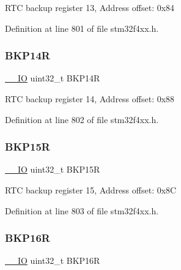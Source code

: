 R\+TC backup register 13, Address offset\+: 0x84 

Definition at line 801 of file stm32f4xx.\+h.

\mbox{\label{struct_r_t_c___type_def_ac60f13e6619724747e61cfbff55b9fab}} 
\subsubsection{\texorpdfstring{B\+K\+P14R}{BKP14R}}
{\footnotesize\ttfamily \hyperlink{group___c_m_s_i_s__core__definitions_gaec43007d9998a0a0e01faede4133d6be}{\+\_\+\+\_\+\+IO} uint32\+\_\+t B\+K\+P14R}

R\+TC backup register 14, Address offset\+: 0x88 

Definition at line 802 of file stm32f4xx.\+h.

\mbox{\label{struct_r_t_c___type_def_afafaddc3a983eb71332b7526d82191ad}} 
\subsubsection{\texorpdfstring{B\+K\+P15R}{BKP15R}}
{\footnotesize\ttfamily \hyperlink{group___c_m_s_i_s__core__definitions_gaec43007d9998a0a0e01faede4133d6be}{\+\_\+\+\_\+\+IO} uint32\+\_\+t B\+K\+P15R}

R\+TC backup register 15, Address offset\+: 0x8C 

Definition at line 803 of file stm32f4xx.\+h.

\mbox{\label{struct_r_t_c___type_def_ad2f2eb2fb4b93e21515b10e920e719b6}} 
\subsubsection{\texorpdfstring{B\+K\+P16R}{BKP16R}}
{\footnotesize\ttfamily \hyperlink{group___c_m_s_i_s__core__definitions_gaec43007d9998a0a0e01faede4133d6be}{\+\_\+\+\_\+\+IO} uint32\+\_\+t B\+K\+P16R}

